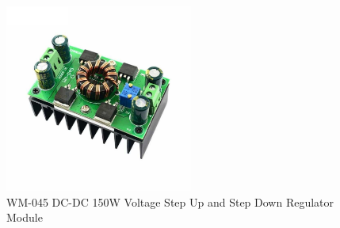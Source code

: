 \documentclass[../../main]{subfiles}
\begin{document}

\newpage
\begin{figure}[H]
    \centering
\includegraphics[width=0.55\textwidth]{fig/actuator_booster.jpg}
\caption{WM-045 DC-DC 150W Voltage Step Up and Step Down Regulator Module }
\label{Linear actuator booster} %
\end{figure}
\end{document}

